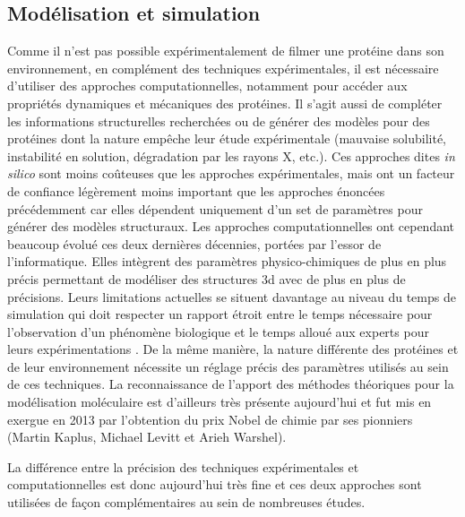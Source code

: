\subsection{Modélisation et simulation} \label{model_simu}

Comme il n'est pas possible expérimentalement de filmer une protéine dans son environnement, en complément des techniques expérimentales, il est nécessaire d'utiliser des approches computationnelles, notamment pour accéder aux propriétés dynamiques et mécaniques des protéines. Il s'agit aussi de compléter les informations structurelles recherchées ou de générer des modèles pour des protéines dont la nature empêche leur étude expérimentale (mauvaise solubilité, instabilité en solution, dégradation par les rayons X, etc.). Ces approches dites \textit{in silico} sont moins coûteuses que les approches expérimentales,
mais ont un facteur de confiance légèrement moins important que les approches énoncées précédemment car elles dépendent uniquement d'un set de paramètres pour générer des modèles structuraux. Les approches computationnelles ont cependant beaucoup évolué ces deux dernières décennies, portées par l'essor de l'informatique. Elles intègrent des paramètres physico-chimiques de plus en plus précis permettant de modéliser des structures 3d avec de plus en plus de précisions. Leurs limitations actuelles se situent davantage au niveau du temps de simulation qui doit respecter un rapport étroit entre le temps nécessaire pour l'observation d'un phénomène biologique et le temps alloué aux experts pour leurs expérimentations \cite{shaw2010atomic}. De la même manière, la nature différente des protéines et de leur environnement nécessite un réglage précis des paramètres utilisés au sein de ces techniques. 
La reconnaissance de l'apport des méthodes théoriques pour la modélisation moléculaire est d'ailleurs très présente aujourd'hui et fut mis en exergue en 2013 par l'obtention du prix Nobel de chimie par ses pionniers (Martin Kaplus, Michael Levitt et Arieh Warshel)\cite{_nobel_2013}.

La différence entre la précision des techniques expérimentales et computationnelles est donc aujourd'hui très fine et ces deux approches sont utilisées de façon complémentaires au sein de nombreuses études.

